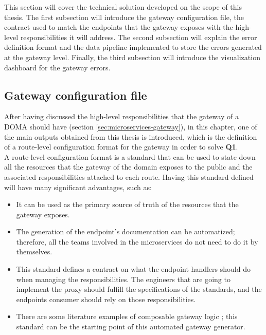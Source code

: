 \documentclass[english, 12pt, a4paper, sci, utf8, a-1b, online]{aaltothesis}
\begin{document}
This section will cover the technical solution developed on the scope of this thesis. The first subsection will introduce the gateway configuration file, the contract used to match the endpoints that the gateway exposes with the high-level responsibilities it will address. The second subsection will explain the error definition format and the data pipeline implemented to store the errors generated at the gateway level. Finally, the third subsection will introduce the visualization dashboard for the gateway errors.

\subsection{Gateway configuration file}
\label{sec:gateway-configuration-file}

After having discussed the high-level responsibilities that the gateway of a DOMA should have (section \ref{sec:microservices-gateway}), in this chapter, one of the main outputs obtained from this thesis is introduced, which is the definition of a route-level configuration format for the gateway in order to solve \textbf{Q1}.\\

A route-level configuration format is a standard that can be used to state down all the resources that the gateway of the domain exposes to the public and the associated responsibilities attached to each route. Having this standard defined will have many significant advantages, such as:

\begin{itemize}
    \item It can be used as the primary source of truth of the resources that the gateway exposes.
    \item The generation of the endpoint's documentation can be automatized; therefore, all the teams involved in the microservices do not need to do it by themselves.
    \item This standard defines a contract on what the endpoint handlers should do when managing the responsibilities. The engineers that are going to implement the proxy should fulfill the specifications of the standards, and the endpoints consumer should rely on those responsibilities.
    \item There are some literature examples of composable gateway logic \cite{UberGateway}; this standard can be the starting point of this automated gateway generator. 
\end{itemize}
\end{document}
